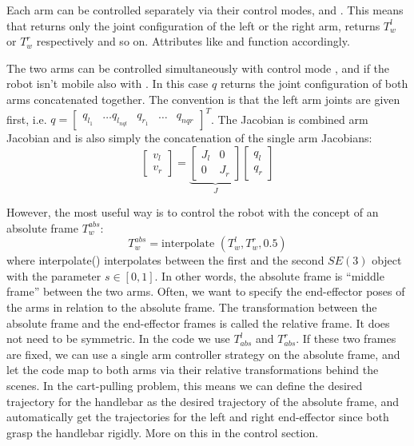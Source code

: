 Each arm can be controlled separately via their control modes,
 and .
This means that  returns only the joint configuration of the left or the right arm,
 returns $ T_{ w }^{ l }  $ or $ T_{ w }^{ r }  $ respectively and so on.
Attributes like  and  function accordingly.

The two arms can be controlled simultaneously with
control mode ,
and if the robot isn't mobile also with .
In this case $ q  $ returns the joint configuration of both arms concatenated together.
The convention is that the left arm joints are given first,
i.e. 
$ q = \begin{bmatrix} q_{ l_{ 1 } } & \dots q_{ l_{ nq l } } & 
q_{ r_{ 1 } } & \dots  & q_{ nqr }\end{bmatrix} ^{ T }   $.
The Jacobian is combined arm Jacobian and is also simply the concatenation of
the single arm Jacobians:
\begin{equation}
\begin{bmatrix} 
v_{ l } \\
v_{ r }
\end{bmatrix} =
\underbrace{\begin{bmatrix} J_{ l } & 0 \\
		0 & J_{r }
\end{bmatrix}}_{ J } 
\begin{bmatrix} 
q_{ l } \\
q_{ r }
\end{bmatrix} 
\end{equation}

However, the most useful way is to control the robot with the concept of an absolute frame
$ T_{ w }^{ abs }  $:
\begin{equation}
T_{ w }^{ abs } = \text{interpolate } (T_{ w }^{ l }, T_w^{ r }, 0.5)
\end{equation}
where interpolate() interpolates between the first and the second
$ SE (3)  $ object with the parameter $ s \in [0,1]  $. 
In other words, the absolute frame is ``middle frame'' between the two arms.
Often, we want to specify the end-effector poses of the arms in relation
to the absolute frame. The transformation between the absolute frame and the
end-effector frames is called the relative frame. It does not need to be symmetric.
In the code we use $ T_{ abs }^{ l }  $ and $ T_{ abs }^{ r }  $. If these two frames
are fixed, we can use a single arm controller strategy on the absolute frame,
and let the code map to both arms via their relative transformations behind the scenes.
In the cart-pulling problem, this means we can define the desired trajectory for
the handlebar as the desired trajectory of the absolute frame,
and automatically get the trajectories for the left and right end-effector 
since both grasp the handlebar rigidly.
More on this in the control section.


